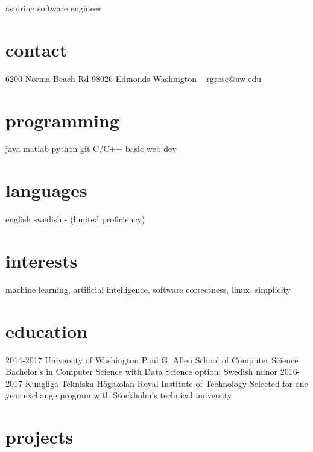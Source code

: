 \documentclass[]{friggeri-cv}
\begin{document}
       {aspiring software engineer}


\begin{aside}
  \section{contact}
    6200 Norma Beach Rd
    98026 Edmonds
    Washington
    ~
    \href{mailto:rgrose@uw.edu}{rgrose@uw.edu}
    \href{https://www.linkedin.com/in/ryanwgrose}{\faLinkedin}
  \section{programming}
    java
    matlab
    python
    git
    C/C++
    basic web dev
  \section{languages}
    english
    swedish -
    (limited proficiency)
\end{aside}

\section{interests}

machine learning, artificial intelligence, software correctness, linux, simplicity

\section{education}

\begin{entrylist}
  \entry
    {2014-2017}
    {University of Washington}
    {Paul G. Allen School of Computer Science}
    {Bachelor's in Computer Science with Data Science option; Swedish minor}
  \entry
    {2016-2017}
    {Kungliga Tekniska Högskolan}
    {Royal Institute of Technology }
    {Selected for one year exchange program with Stockholm's technical university}
\end{entrylist}

\section{projects}
\end{document}
